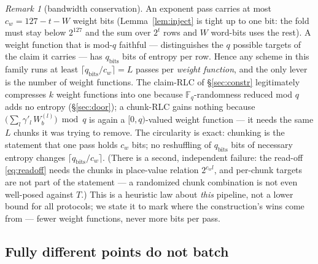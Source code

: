 \documentclass[11pt]{article}
\newcommand{\F}{\mathbb{F}}
\newcommand{\Fq}{\F_q}                 %
\newcommand{\cw}{c_w}
\theoremstyle{plain}
\theoremstyle{definition}
\theoremstyle{remark}
\newtheorem{remark}[theorem]{Remark}
\begin{document}
\begin{remark}[bandwidth conservation]\label{rem:conservation}
An exponent pass carries at most $\cw = 127-t-W$ weight bits
(Lemma~\ref{lem:inject} is tight up to one bit: the fold must stay below
$2^{127}$ and the sum over $2^{t}$ rows and $W$ word-bits uses the rest).
A weight function that is mod-$q$ faithful --- distinguishes the $q$ possible
targets of the claim it carries --- has $q_{\mathrm{bits}}$ bits of entropy
per row. Hence any scheme in this family runs at least
$\lceil q_{\mathrm{bits}}/\cw\rceil = L$ passes per \emph{weight function},
and the only lever is the number of weight functions. The claim-RLC of
\S\ref{sec:constr} legitimately compresses $k$ weight functions into one
because $\Fq$-randomness reduced mod $q$ adds no entropy
(\S\ref{sec:door}); a chunk-RLC gains nothing because
$\bigl(\sum_l \gamma'_l\, W^{(l)}_b\bigr)\bmod q$ is again a $[0,q)$-valued
weight function --- it needs the same $L$ chunks it was trying to remove.
The circularity is exact: chunking is the statement that one pass holds
$\cw$ bits; no reshuffling of $q_{\mathrm{bits}}$ bits of necessary
entropy changes $\lceil q_{\mathrm{bits}}/\cw\rceil$. (There is a second,
independent failure: the read-off \eqref{eq:readoff} needs the chunks in
place-value relation $2^{\cw l}$, and per-chunk targets are not part of the
statement --- a randomized chunk combination is not even well-posed against
$T$.) This is a heuristic law about \emph{this} pipeline, not a lower bound
for all protocols; we state it to mark where the construction's wins come
from --- fewer weight functions, never more bits per pass.
\end{remark}

\subsection{Fully different points do not batch}\label{sec:mixed}
\end{document}
